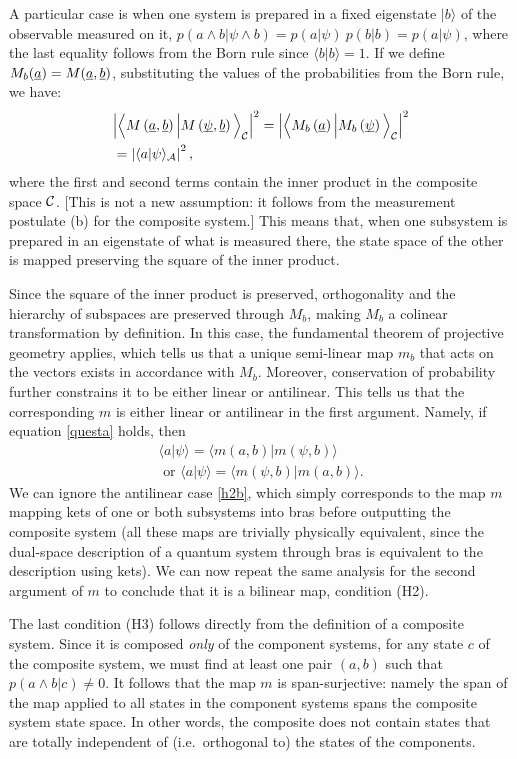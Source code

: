\documentclass[aps,prl,amsmath,amssymb,twocolumn,nofootinbib]{revtex4}
\theoremstyle{plain}
\theoremstyle{definition}
\theoremstyle{remark}
\newcommand{\pj}[1] {\underbar{$#1$}}
\def\>{\rangle}
\def\<{\langle}
\def\labell#1{\label{#1}}
\begin{document}
	A particular case is when one system is
	prepared in a fixed eigenstate $|b\>$ of the observable measured on it,
	$p(a\wedge b|\psi\wedge b)=p(a|\psi)\:p(b|b)=p(a|\psi)$, where the last equality follows from the Born rule since $\<b|b\>=1$. 
	If we define $M_b(\pj{a}) = M(\pj{a},\pj{b})$, substituting the values of the
	probabilities from the Born rule, we have:
	\begin{align} &\Big|\Big\<M\left(\pj{a},\pj{b}\right)\Big|M\left(\pj{\psi},\pj{b}\right)\Big\>_{\cal C}\Big|^2
	=\Big|\Big\<M_b\left(\pj{a}\right)\Big|M_b\left(\pj{\psi}\right)\Big\>_{\cal C}\Big|^2
	\nonumber \\&
	=\left|\<a|\psi\>_{\cal A}\right|^2
	\labell{questa},
	\end{align}
	where the first and second terms contain the inner product in the composite
	space $\cal C$. [This is not a new assumption: it follows from the
	measurement postulate (b) for the composite system.] This means that,
	when one subsystem is prepared in an eigenstate of what is measured
	there, the state space of the other is mapped preserving the square of
	the inner product.
	
	Since the square of the inner product is preserved, orthogonality and
	the hierarchy of subspaces are preserved through $M_b$, making $M_b$ a
	colinear transformation by definition. In this case, the fundamental
	theorem of projective geometry \cite{fun} applies, which tells us that
	a unique semi-linear map $m_b$ that acts on the vectors exists in accordance with $M_b$.
	Moreover, conservation of probability further constrains it to be
	either linear or antilinear. This tells us that the corresponding $m$
	is either linear or antilinear in the first argument. Namely, if equation
	\eqref{questa} holds, then
	\begin{align}
	\<a|\psi\>=\<m(a,b)|m(\psi,b)\>\labell{h2}\;
	\\\mbox{ or }
	\<a|\psi\>=\<m(\psi,b)|m(a,b)\> \labell{h2b}.
	\end{align}
	We can ignore the antilinear case \eqref{h2b}, which simply
	corresponds to the map $m$ mapping kets of one or both subsystems into
	bras before outputting the composite system (all these maps are
	trivially physically equivalent, since the dual-space description of a
	quantum system through bras is equivalent to the description using
	kets). We can now repeat the same analysis for the second argument of
	$m$ to conclude that it is a bilinear map, condition (H2).
	
	The last condition (H3) follows directly from the definition of a
	composite system. Since it is composed {\em only} of the component
	systems, for any state $c$ of the composite system, we must find at least one pair $(a, b)$ such that $p(a\wedge b | c)\neq 0$. It follows that the map $m$ is span-surjective: namely the
	span of the map applied to all states in the component systems spans
	the composite system state space. In other words, the composite does
	not contain states that are totally independent of (i.e.~orthogonal
	to) the states of the components.
	
\end{document}
